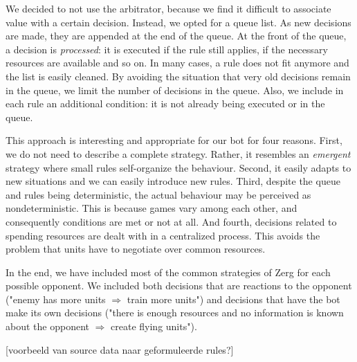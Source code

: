 We decided to not use the arbitrator, because we find it difficult to associate value with a certain decision. Instead, we opted for a queue list. As new decisions are made, they are appended at the end of the queue. At the front of the queue, a decision is \emph{processed}: it is executed if the rule still applies, if the necessary resources are available and so on. In many cases, a rule does not fit anymore and the list is easily cleaned. By avoiding the situation that very old decisions remain in the queue, we limit the number of decisions in the queue. Also, we include in each rule an additional condition: it is not already being executed or in the queue.

This approach is interesting and appropriate for our bot for four reasons. First, we do not need to describe a complete strategy. Rather, it resembles an \emph{emergent} strategy where small rules self-organize the behaviour. Second, it easily adapts to new situations and we can easily introduce new rules. Third, despite the queue and rules being deterministic, the actual behaviour may be perceived as nondeterministic. This is because games vary among each other, and consequently conditions are met or not at all. And fourth, decisions related to spending resources are dealt with in a centralized process. This avoids the problem that units have to negotiate over common resources.

In the end, we have included most of the common strategies of Zerg for each possible opponent. We included both decisions that are reactions to the opponent ("enemy has more units $\Rightarrow$ train more units") and decisions that have the bot make its own decisions ("there is enough resources and no information is known about the opponent $\Rightarrow$ create flying units"). 

[voorbeeld van source data naar geformuleerde rules?]




%
%
%


